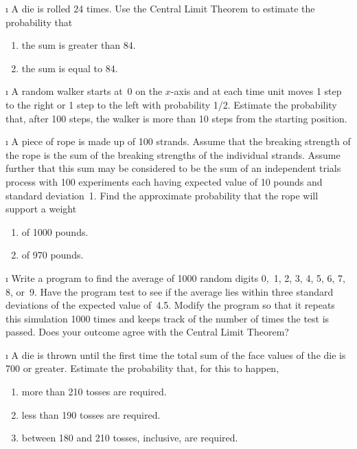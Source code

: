 \exercises
\begin{LJSItem}

\i\label{exer 9.2.100}  A die is rolled 24 times.  Use the Central Limit Theorem to estimate the
probability that
\begin{enumerate}
\item  the sum is greater than 84.

\item  the sum is equal to 84.
\end{enumerate}

\i\label{exer 9.2.101}  A random walker starts at~0 on the $x$-axis and at each time unit moves 1
step to the right or 1 step to the left with probability 1/2.  Estimate the
probability that, after 100 steps, the walker is more than 10 steps from the
starting position.

\i\label{exer 9.2.102}  A piece of rope is made up of 100 strands.  Assume that the breaking
strength of the rope is the sum of the breaking strengths of the individual
strands.  Assume further that this sum may be considered to be the sum of an
independent trials process with 100 experiments each having expected value of
10 pounds and standard deviation~1.  Find the approximate probability that the
rope will support a weight
\begin{enumerate}
\item  of 1000 pounds.

\item  of 970 pounds.
\end{enumerate}

\i\label{exer 9.2.103}  Write a program to find the average of 1000 random digits 0,~1, 2, 3, 4,
5, 6, 7, 8, or~9.  Have the program test to see if the average lies within
three standard deviations of the expected value of~4.5.  Modify the program so
that it repeats this simulation 1000 times and keeps track of the number of
times the test is passed.  Does your outcome agree with the Central Limit
Theorem?

\i\label{exer 9.2.104}  A die is thrown until the first time the total sum of the face values of
the die is 700 or greater.  Estimate the probability that, for this to happen,
\begin{enumerate}
\item  more than 210 tosses are required.

\item  less than 190 tosses are required.

\item  between 180 and 210 tosses, inclusive, are required.
\end{enumerate}


\end{LJSItem}
